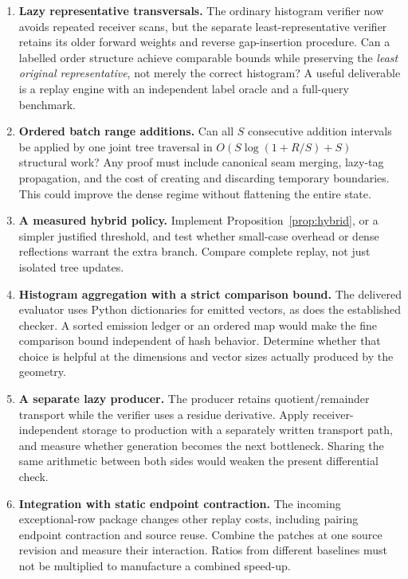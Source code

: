 \begin{enumerate}[leftmargin=*,label=\textbf{\arabic*.}]
\item \textbf{Lazy representative transversals.}
The ordinary histogram verifier now avoids repeated receiver scans, but
the separate least-representative verifier retains its older forward
weights and reverse gap-insertion procedure. Can a labelled order
structure achieve comparable bounds while preserving the \emph{least
original representative}, not merely the correct histogram? A useful
deliverable is a replay engine with an independent label oracle and a
full-query benchmark.

\item \textbf{Ordered batch range additions.}
Can all \(S\) consecutive addition intervals be applied by one joint
tree traversal in
\(O(S\log(1+R/S)+S)\) structural work? Any proof must include
canonical seam merging, lazy-tag propagation, and the cost of creating
and discarding temporary boundaries. This could improve the dense
regime without flattening the entire state.

\item \textbf{A measured hybrid policy.}
Implement Proposition~\ref{prop:hybrid}, or a simpler justified
threshold, and test whether small-case overhead or dense reflections
warrant the extra branch. Compare complete replay, not just isolated
tree updates.

\item \textbf{Histogram aggregation with a strict comparison bound.}
The delivered evaluator uses Python dictionaries for emitted vectors,
as does the established checker. A sorted emission ledger or an
ordered map would make the fine comparison bound independent of hash
behavior. Determine whether that choice is helpful at the dimensions
and vector sizes actually produced by the geometry.

\item \textbf{A separate lazy producer.}
The producer retains quotient/remainder transport while the verifier
uses a residue derivative. Apply receiver-independent storage to
production with a separately written transport path, and measure
whether generation becomes the next bottleneck. Sharing the same
arithmetic between both sides would weaken the present differential
check.

\item \textbf{Integration with static endpoint contraction.}
The incoming exceptional-row package changes other replay costs,
including pairing endpoint contraction and source reuse. Combine the
patches at one source revision and measure their interaction. Ratios
from different baselines must not be multiplied to manufacture a
combined speed-up.


\end{enumerate}

